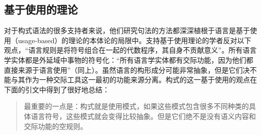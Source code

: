 \subsection{基于使用的理论}\label{usage-based-sec}
    对于构式语法的很多支持者来说，他们研究句法的方法都深深植根于语言是基于使用（usage-based）的理论\citep{Langacker87a-u, Goldberg95a,Croft2001a, Tomasello2003a}的本体论的局限中。支持基于使用理论的学者反对以下观点，“语言规则是将符号组合在一起的代数程序，其自身不贡献意义”\citep[]{Tomasello2003a}。所有语言学实体都是外延域中事物的符号化：“所有语言学实体都有交际功能，因为他们都直接来源于语言使用”（同上）。虽然语言的构形成分可能非常抽象，但是它们决不能与其作为一种交际工具这一最初的功能来源分离。构式的这一基于使用的观点在下面的引文中得到了很好地总结：
\begin{quote}
最重要的一点是：构式就是使用模式，如果这些模式包含很多不同种类的具体语言符号，这些模式就会变得比较抽象。但是它们绝不是没有语义内容和交际功能的空规则。\citep[]{Tomasello2003a}
\end{quote}


